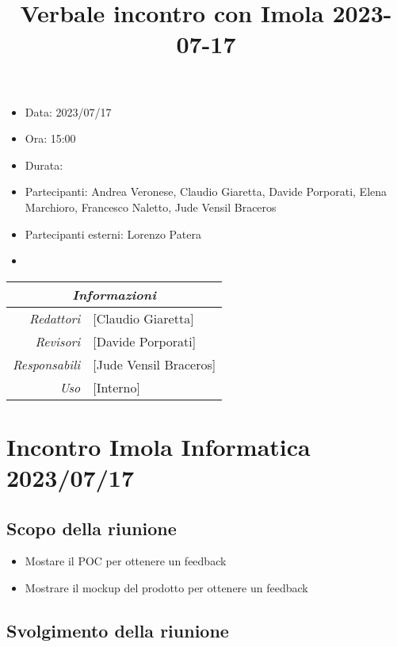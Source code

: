 \documentclass[12pt]{article}
\begin{document}
\graphicspath{ {../../templates/img} }

\title{Verbale incontro con Imola 2023-07-17}
\firstPage
\maketitle

\begin{center}
    \begin{itemize}
        \item[] Data: 2023/07/17
        \item[] Ora: 15:00
        \item[] Durata: 
        \item[] Partecipanti: Andrea Veronese, Claudio Giaretta, Davide Porporati, Elena Marchioro, Francesco Naletto, Jude Vensil Braceros
        \item[] Partecipanti esterni: Lorenzo Patera
        \item[] 
        \end{itemize}
    \begin{tabular}{r | l}
		\multicolumn{2}{c}{\textit{Informazioni}}\\
		\hline
		
			\textit{Redattori} &
			[Claudio Giaretta]\makecell{}\\
		
			\textit{Revisori} &
			[Davide Porporati]\makecell{}\\
			\textit{Responsabili} &
			[Jude Vensil Braceros]\makecell{}\\
		      \textit{Uso} & 
                [Interno]\makecell{}\\
\end{tabular}
\end{center}

\tableofcontents
\printindex
\section{Incontro Imola Informatica 2023/07/17}
\subsection{Scopo della riunione}
\begin{itemize}
    \item Mostare il POC per ottenere un feedback
    \item Mostrare il mockup del prodotto per ottenere un feedback
\end{itemize}
\subsection{Svolgimento della riunione}
\end{document}
